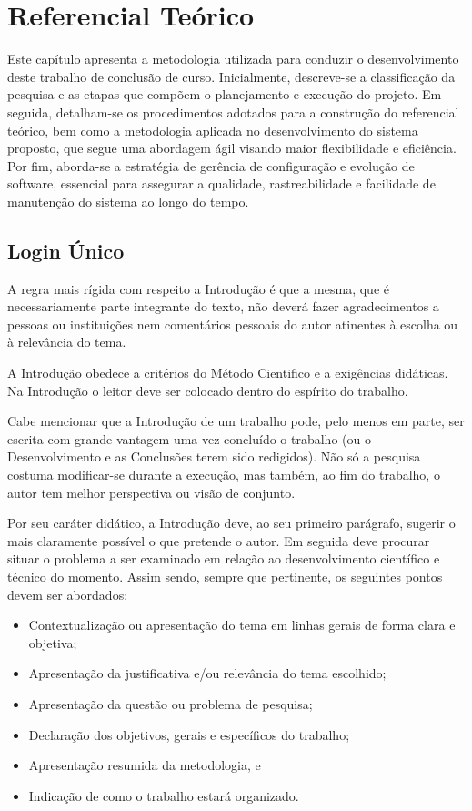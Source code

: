 \chapter[Referencial Teórico]{Referencial Teórico}

Este capítulo apresenta a metodologia utilizada para conduzir o desenvolvimento deste trabalho de conclusão de curso. Inicialmente, descreve-se a classificação da pesquisa e as etapas que compõem o planejamento e execução do projeto. Em seguida, detalham-se os procedimentos adotados para a construção do referencial teórico, bem como a metodologia aplicada no desenvolvimento do sistema proposto, que segue uma abordagem ágil visando maior flexibilidade e eficiência. Por fim, aborda-se a estratégia de gerência de configuração e evolução de software, essencial para assegurar a qualidade, rastreabilidade e facilidade de manutenção do sistema ao longo do tempo.

\section{Login Único}

A regra mais rígida com respeito a Introdução é que a mesma, que é 
necessariamente parte integrante do texto, não deverá fazer agradecimentos 
a pessoas ou instituições nem comentários pessoais do autor atinentes à 
escolha ou à relevância do tema.

A Introdução obedece a critérios do Método Cientifico e a exigências 
didáticas. Na Introdução o leitor deve ser colocado dentro do espírito do 
trabalho.

Cabe mencionar que a Introdução de um trabalho pode, pelo menos em parte, 
ser escrita com grande vantagem uma vez concluído o trabalho (ou o 
Desenvolvimento e as Conclusões terem sido redigidos). Não só a pesquisa 
costuma modificar-se durante a execução, mas também, ao fim do trabalho, o 
autor tem melhor perspectiva ou visão de conjunto.

Por seu caráter didático, a Introdução deve, ao seu primeiro parágrafo, 
sugerir o mais claramente possível o que pretende o autor. Em seguida deve 
procurar situar o problema a ser examinado em relação ao desenvolvimento 
científico e técnico do momento. Assim sendo, sempre que pertinente, os 
seguintes pontos devem ser abordados: 

\begin{itemize}

	\item Contextualização ou apresentação do tema em linhas gerais de 
	forma clara e objetiva;
	\item Apresentação da justificativa e/ou relevância do tema escolhido;
	\item Apresentação da questão ou problema de pesquisa;
	\item Declaração dos objetivos, gerais e específicos do trabalho;
	\item Apresentação resumida da metodologia, e
	\item Indicação de como o trabalho estará organizado.

\end{itemize}

